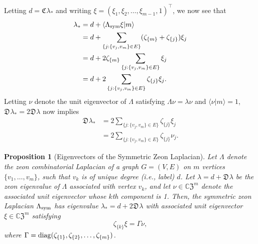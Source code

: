 \documentclass{article}
\newtheorem{proposition}[theorem]{Proposition}
\theoremstyle{definition}
\newcommand{\zco}{\mathfrak{C}\mspace{1mu}}
\newcommand{\zdu}{\mathfrak{D}\mspace{1mu}}
\newcommand{\CZ}{\mathbb{C}\mathfrak{Z}}
\numberwithin{equation}{section}
\begin{document}
Letting $d=\zco\lambda_*$ and writing $\xi=(\xi_1, \xi_2,\ldots, \xi_{m-1},1)^\intercal$, we now see that
\begin{align*}
\lambda_*&=d+\langle \Lambda_{\rm sym}\xi\vert m\rangle\\
&=d+\sum_{\{j: \{v_j,v_m\}\in E\}}(\zeta_{\{m\}}+\zeta_{\{j\}})\xi_j\\
&=d+2\zeta_{\{m\}}\sum_{\{j: \{v_j,v_m\}\in E\}}\xi_j\\
&=d+2\sum_{\{j: \{v_j,v_m\}\in E\}}\zeta_{\{j\}}\xi_j.
\end{align*}
Letting $\nu$ denote the unit eigenvector of $\Lambda$ satisfying $\Lambda \nu=\lambda\nu$ and $\langle \nu\vert m\rangle=1$,  $\zdu\lambda_*=2\zdu\lambda$ now implies 
\begin{align*}
\zdu\lambda_*&=2\sum_{\{j:\{v_j,v_m\}\in E\}}\zeta_{\{j\}}\xi_j\\
&=2\sum_{\{j:\{v_j,v_m\}\in E\}}\zeta_{\{j\}}\nu_j.
\end{align*}  

\begin{proposition}[Eigenvectors of the Symmetric Zeon Laplacian]\label{symmetric eigenvectors}
Let $\Lambda$ denote the zeon combinatorial Laplacian of a graph $G=(V,E)$ on $m$ vertices $\{v_1, \ldots, v_m\}$, such that $v_k$ is of unique degree (i.e., label) $d$.  Let $\lambda=d+\zdu\lambda$ be the zeon eigenvalue of $\Lambda$ associated with vertex $v_k$, and let $\nu\in\CZ^m$ denote the associated unit eigenvector whose $k$th component is 1.  Then, the symmetric zeon Laplacian $\Lambda_{\rm sym}$ has eigenvalue $\lambda_*=d+2\zdu\lambda$ with associated unit eigenvector $\xi\in\CZ^m$ satisfying \begin{equation}
\zeta_{\{k\}}\xi=\Gamma\nu,
\end{equation}
where $\Gamma={\rm diag}(\zeta_{\{1\}},\zeta_{\{2\}},\ldots, \zeta_{\{m\}})$.
\end{proposition}
\end{document}
